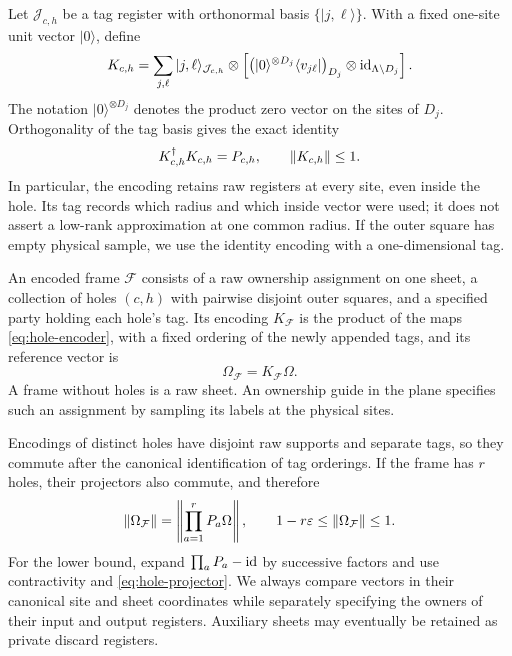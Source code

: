 Let $\mathcal J_{c,h}$ be a tag register with orthonormal basis
$\{|j,\ell\rangle\}$.  With a fixed one-site unit vector $|0\rangle$, define
\begin{equation}\label{eq:hole-encoder}
 K_{c,h}
  =\sum_{j,\ell}|j,\ell\rangle_{\mathcal J_{c,h}}\otimes
       \left[
       \bigl(|0\rangle^{\otimes D_j}\langle v_{j\ell}|\bigr)_{D_j}
           \otimes\operatorname{id}_{\Lambda\setminus D_j}
       \right].
\end{equation}
The notation $|0\rangle^{\otimes D_j}$ denotes the product zero vector on
the sites of $D_j$.  Orthogonality of the tag basis gives the exact identity
\begin{equation}\label{eq:encoder-contraction}
 K_{c,h}^{\dagger}K_{c,h}=P_{c,h},\qquad \lVert K_{c,h}\rVert\le1.
\end{equation}
In particular, the encoding retains raw registers at every site, even inside
the hole.  Its tag records which radius and which inside vector were used;
it does not assert a low-rank approximation at one common radius.  If the
outer square has empty physical sample, we use the identity encoding with
a one-dimensional tag.

\begin{definition}\label{def:frame}
An encoded frame $\mathcal F$ consists of a raw ownership assignment on one
sheet, a collection of holes $(c,h)$ with pairwise disjoint outer squares,
and a specified party holding each hole's tag.  Its encoding $K_{\mathcal F}$
is the product of the maps \eqref{eq:hole-encoder}, with a fixed ordering of
the newly appended tags, and its reference vector is
\begin{equation}\label{eq:frame-vector}
  \Omega_{\mathcal F}=K_{\mathcal F}\Omega.
\end{equation}
A frame without holes is a raw sheet.  An ownership guide in the plane
specifies such an assignment by sampling its labels at the physical sites.
\end{definition}

Encodings of distinct holes have disjoint raw supports and separate tags,
so they commute after the canonical identification of tag orderings.
If the frame has $r$ holes, their projectors also commute, and therefore
\begin{equation}\label{eq:frame-norm}
 \lVert \Omega_{\mathcal F}\rVert
   =\left\|\prod_{a=1}^{r}P_a\Omega\right\|,
 \qquad
 1-r\varepsilon\le\lVert \Omega_{\mathcal F}\rVert\le1.
\end{equation}
For the lower bound, expand $\prod_aP_a-\operatorname{id}$ by successive factors and use
contractivity and \eqref{eq:hole-projector}.  We always compare vectors in
their canonical site and sheet coordinates while separately specifying the
owners of their input and output registers.  Auxiliary sheets may eventually
be retained as private discard registers.

